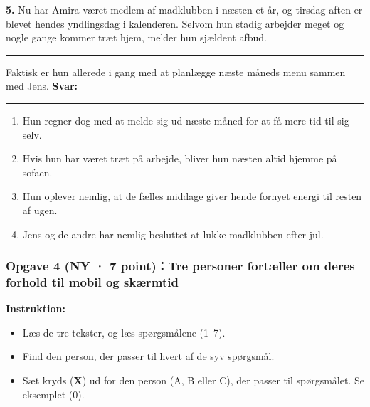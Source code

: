 \vspace{0.25em}
\textbf{5.} Nu har Amira været medlem af madklubben i næsten et år, og tirsdag aften er blevet hendes yndlingsdag i kalenderen. Selvom hun stadig arbejder meget og nogle gange kommer træt hjem, melder hun sjældent afbud. \rule{2.4cm}{0.4pt} Faktisk er hun allerede i gang med at planlægge næste måneds menu sammen med Jens. \quad \textbf{Svar:} \rule{1.0cm}{0.4pt}
\begin{enumerate}[label=\textbf{\Alph*.}, leftmargin=2.2em, itemsep=0.12em]
  \item Hun regner dog med at melde sig ud næste måned for at få mere tid til sig selv.
  \item Hvis hun har været træt på arbejde, bliver hun næsten altid hjemme på sofaen.
  \item Hun oplever nemlig, at de fælles middage giver hende fornyet energi til resten af ugen.
  \item Jens og de andre har nemlig besluttet at lukke madklubben efter jul.
\end{enumerate}

\subsubsection*{Opgave 4 (NY · 7 point)：Tre personer fortæller om deres forhold til mobil og skærmtid}

\textbf{Instruktion:}
\begin{itemize}
  \item Læs de tre tekster, og læs spørgsmålene (1--7).
  \item Find den person, der passer til hvert af de syv spørgsmål.
  \item Sæt kryds (\textbf{X}) ud for den person (A, B eller C), der passer til spørgsmålet. Se eksemplet (0).
\end{itemize}


